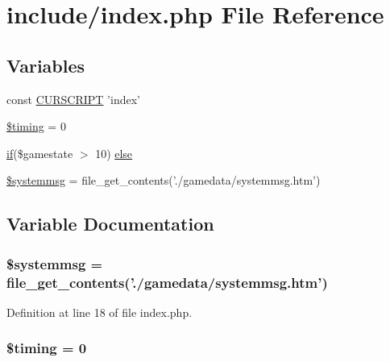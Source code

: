 \hypertarget{include_2index_8php}{\section{include/index.php File Reference}
\label{include_2index_8php}
}
\subsection*{Variables}
\begin{DoxyCompactItemize}
\item 
const \hyperlink{include_2index_8php_a39c39f525eceb86cabc338804f230e80}{C\+U\+R\+S\+C\+R\+I\+P\+T} 'index'
\item 
\hyperlink{include_2index_8php_a97244fa294e503a8466e58852d8834ae}{\$timing} = 0
\item 
\hyperlink{login__old_8php_a4ac1118c2e44c513a674bc1793ba6c90}{if}(\$gamestate $>$ 10) \hyperlink{include_2index_8php_a15c453aad2aec18a240268ba90f07be0}{else}
\item 
\hyperlink{include_2index_8php_a55ca8f809e3f66df41dedfdc9e85649e}{\$systemmsg} = file\+\_\+get\+\_\+contents('./gamedata/systemmsg.\+htm')
\end{DoxyCompactItemize}


\subsection{Variable Documentation}
\hypertarget{include_2index_8php_a55ca8f809e3f66df41dedfdc9e85649e}{
\subsubsection[{\$systemmsg}]{\setlength{\rightskip}{0pt plus 5cm}\$systemmsg = file\+\_\+get\+\_\+contents('./gamedata/systemmsg.\+htm')}}\label{include_2index_8php_a55ca8f809e3f66df41dedfdc9e85649e}


Definition at line 18 of file index.\+php.

\hypertarget{include_2index_8php_a97244fa294e503a8466e58852d8834ae}{
\subsubsection[{\$timing}]{\setlength{\rightskip}{0pt plus 5cm}\$timing = 0}}\label{include_2index_8php_a97244fa294e503a8466e58852d8834ae}


